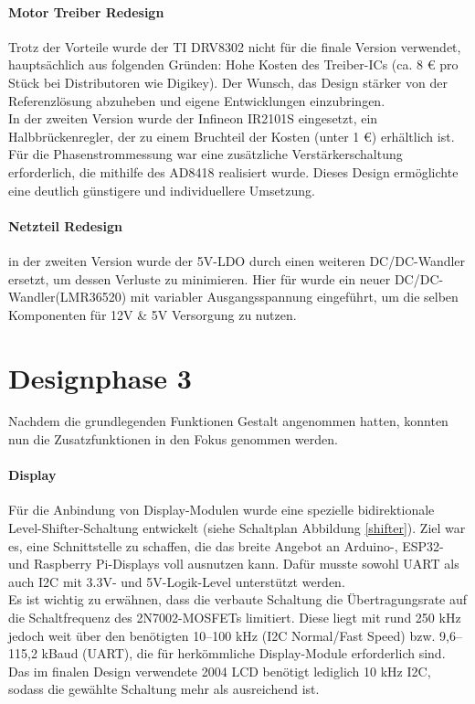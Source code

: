 \documentclass[paper=a4,11pt]{scrreprt}
\begin{document}
\paragraph{Motor Treiber Redesign}
Trotz der Vorteile wurde der TI DRV8302 nicht für die finale Version verwendet, hauptsächlich aus folgenden Gründen: Hohe Kosten des Treiber-ICs (ca. 8 € pro Stück bei Distributoren wie Digikey).
Der Wunsch, das Design stärker von der Referenzlösung abzuheben und eigene Entwicklungen einzubringen.\\
In der zweiten Version wurde der Infineon IR2101S eingesetzt, ein Halbbrückenregler, der zu einem Bruchteil der Kosten (unter 1 €) erhältlich ist. Für die Phasenstrommessung war eine zusätzliche Verstärkerschaltung erforderlich, die mithilfe des AD8418 realisiert wurde. Dieses Design ermöglichte eine deutlich günstigere und individuellere Umsetzung.
\paragraph{Netzteil Redesign}
in der zweiten Version wurde der 5V-LDO durch einen weiteren DC/DC-Wandler ersetzt, um dessen Verluste zu minimieren. Hier für wurde ein neuer DC/DC-Wandler(LMR36520) mit variabler Ausgangsspannung eingeführt, um die selben Komponenten für 12V \& 5V Versorgung zu nutzen.
\section{Designphase 3}
Nachdem die grundlegenden Funktionen Gestalt angenommen hatten, konnten nun die Zusatzfunktionen in den Fokus genommen werden.
\paragraph{Display}
Für die Anbindung von Display-Modulen wurde eine spezielle bidirektionale Level-Shifter-Schaltung entwickelt (siehe Schaltplan Abbildung \ref{shifter}). Ziel war es, eine Schnittstelle zu schaffen, die das breite Angebot an Arduino-, ESP32- und Raspberry Pi-Displays voll ausnutzen kann. Dafür musste sowohl UART als auch I2C mit 3.3V- und 5V-Logik-Level unterstützt werden.\\
Es ist wichtig zu erwähnen, dass die verbaute Schaltung die Übertragungsrate auf die Schaltfrequenz des 2N7002-MOSFETs limitiert. Diese liegt mit rund 250 kHz jedoch weit über den benötigten 10–100 kHz (I2C Normal/Fast Speed) bzw. 9,6–115,2 kBaud (UART), die für herkömmliche Display-Module erforderlich sind. Das im finalen Design verwendete 2004 LCD benötigt lediglich 10 kHz I2C, sodass die gewählte Schaltung mehr als ausreichend ist.
\end{document}
